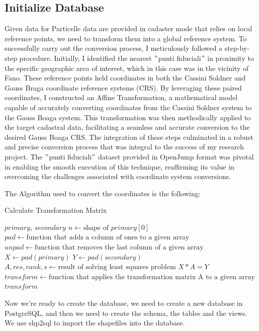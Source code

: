\subsection{Initialize Database}\label{subsec:database-implementation}
Given data for Particelle data are provided in cadaster mode that relies on local reference points, we need to transform them into a global reference system.
To successfully carry out the conversion process, I meticulously followed a step-by-step procedure.
Initially, I identified the nearest \("\)punti fiduciali\("\) in proximity to the specific geographic area of interest, which in this case was in the vicinity of Fano.
These reference points held coordinates in both the Cassini Soldner and Gauss Braga coordinate reference systems (CRS).
By leveraging these paired coordinates, I constructed an Affine Transformation, a mathematical model capable of accurately converting coordinates from the Cassini Soldner system to the Gauss Boaga system.
This transformation was then methodically applied to the target cadastral data, facilitating a seamless and accurate conversion to the desired Gauss Boaga CRS.
The integration of these steps culminated in a robust and precise conversion process that was integral to the success of my research project.
The \("\)punti fiduciali\("\) dataset provided in OpenJump format was pivotal in enabling the smooth execution of this technique, reaffirming its value in overcoming the challenges associated with coordinate system conversions.

The Algorithm used to convert the coordinates is the following:
\begin{algorithm}[H]
    \caption{Calculate Transformation Matrix}
    \begin{algorithmic}[1]
        \REQUIRE $primary$, $secondary$
        \STATE $n \gets \text{shape of } primary[0]$
        \STATE $pad \gets \text{function that adds a column of ones to a given array}$
        \STATE $unpad \gets \text{function that removes the last column of a given array}$
        \STATE $X \gets pad(primary)$
        \STATE $Y \gets pad(secondary)$
        \STATE $A, res, rank, s \gets \text{result of solving least squares problem } X * A = Y$
        \STATE $transform \gets \text{function that applies the transformation matrix A to a given array}$
        \RETURN $transform$
    \end{algorithmic}
\end{algorithm}

Now we're ready to create the database, we need to create a new database in PostgreSQL, and then we need to create the schema, the tables and the views.
We use shp2sql to import the shapefiles into the database.

